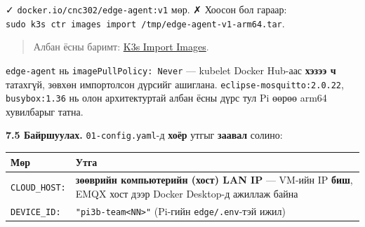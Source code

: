 \begin{Shaded}
\begin{Highlighting}[]
\KeywordTok{;} \KeywordTok{|} 
\end{Highlighting}
\end{Shaded}

✓ \texttt{docker.\allowbreak{}io/\allowbreak{}cnc302/\allowbreak{}edge-agent:\allowbreak{}v1} мөр. ✗ Хоосон бол гараар: \texttt{sudo\ k3s\ ctr\ images\ import\ /\allowbreak{}tmp/\allowbreak{}edge-agent-v1-arm64.\allowbreak{}tar}.

\begin{quote}
Албан ёсны баримт: \href{https://docs.k3s.io/add-ons/import-images}{K3s Import Images}.
\end{quote}

\texttt{edge-agent} нь \texttt{imagePullPolicy:\allowbreak{}\ Never} --- kubelet Docker Hub-аас \textbf{хэзээ ч} татахгүй, зөвхөн импортолсон дүрсийг ашиглана. \texttt{eclipse-mosquitto:\allowbreak{}2.\allowbreak{}0.\allowbreak{}22}, \texttt{busybox:1.36} нь олон архитектуртай албан ёсны дүрс тул Pi өөрөө arm64 хувилбарыг татна.

\textbf{7.5 Байршуулах.} \texttt{01-config.yaml}-д \textbf{хоёр} утгыг \textbf{заавал} солино:

\begingroup\scriptsize\begin{longtable}[]{@{}ll@{}}
\toprule
\begin{minipage}[b]{0.47\columnwidth}\raggedright
Мөр\strut
\end{minipage} & \begin{minipage}[b]{0.47\columnwidth}\raggedright
Утга\strut
\end{minipage}\tabularnewline
\midrule
\endhead
\begin{minipage}[t]{0.47\columnwidth}\raggedright
\texttt{CLOUD\_HOST:}\strut
\end{minipage} & \begin{minipage}[t]{0.47\columnwidth}\raggedright
\textbf{зөөврийн компьютерийн (хост) LAN IP} --- VM-ийн IP \textbf{биш}, EMQX хост дээр Docker Desktop-д ажиллаж байна\strut
\end{minipage}\tabularnewline
\begin{minipage}[t]{0.47\columnwidth}\raggedright
\texttt{DEVICE\_ID:}\strut
\end{minipage} & \begin{minipage}[t]{0.47\columnwidth}\raggedright
\texttt{"pi3b-team\textless{}NN\textgreater{}"} (Pi-гийн \texttt{edge/.env}-тэй ижил)\strut
\end{minipage}\tabularnewline
\bottomrule
\end{longtable}\endgroup

